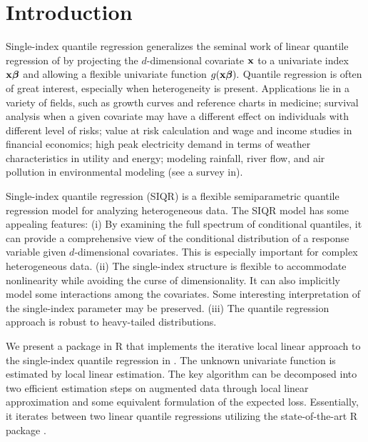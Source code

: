 \section{Introduction}

Single-index quantile regression \citep{wu_single-index_2010} generalizes the seminal work of linear quantile regression of \cite{koenker_regression_1978} by projecting the $d$-dimensional covariate ${\bf x}$ to a univariate index ${\bf x}\mbox{\boldmath$\beta$}$ and allowing a flexible univariate function $g({\bf x}\mbox{\boldmath$\beta$}).$ Quantile regression is often of great interest, especially when heterogeneity is present. Applications lie in a variety of fields, such as growth curves and reference
charts in medicine; survival analysis when a given covariate may have a different effect on individuals with different level of risks; value at risk calculation and wage and income studies in financial economics; high peak electricity demand in terms of weather characteristics in utility and energy; modeling rainfall, river flow, and air pollution in environmental modeling (see a survey in\citealt{yu_quantile_2003}). 

Single-index quantile regression (SIQR) is a flexible semiparametric quantile regression model for analyzing heterogeneous data. The SIQR model has some appealing features: (i)
By examining the full spectrum of conditional quantiles, it can provide a comprehensive view of the conditional distribution of a response variable given $d$-dimensional covariates. This is especially important for complex heterogeneous data. (ii) The single-index structure is flexible to accommodate nonlinearity while avoiding the curse of dimensionality. It can also implicitly model some interactions among the covariates. Some interesting interpretation of the single-index parameter may be preserved. (iii) The quantile regression approach is robust to heavy-tailed distributions.

We present a package  in R that implements the iterative local linear approach to the single-index quantile regression in \cite{wu_single-index_2010}. The unknown univariate function is estimated by local linear estimation. The key algorithm can be decomposed into two efficient estimation steps on augmented data through local linear approximation and some equivalent formulation of the expected loss. Essentially, it iterates between two linear quantile regressions utilizing the state-of-the-art R package . 

